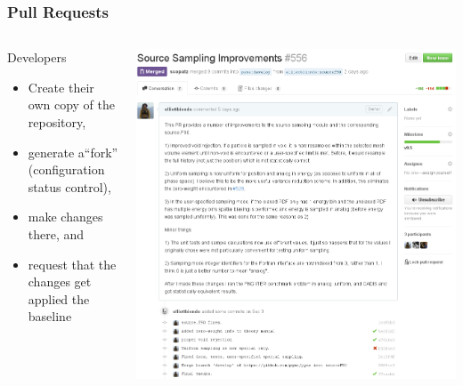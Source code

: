 \documentclass[12pt]{beamer}
\begin{document}
\begin{frame}
\frametitle{Pull Requests}

\begin{columns}
\begin{column}{0.5\textwidth}

Developers
    \begin{itemize}
    \item Create their own copy of the repository,
    \item generate a``fork'' (\alert{configuration status control}), 
    \item make changes there, and 
    \item request that the changes get applied the baseline
    \end{itemize}
\end{column}
\begin{column}{0.5\textwidth}
    \includegraphics[width=\textwidth]{figures/PR_prop.png}
\end{column}
\end{columns}

\end{frame}
\end{document}
